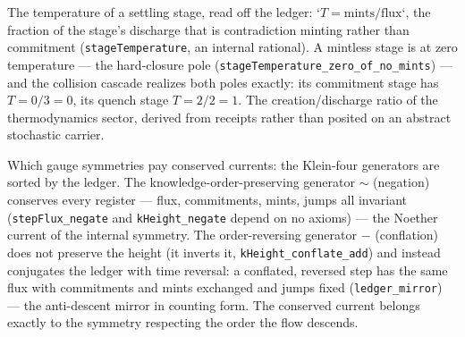 \begin{theorem}\label{thm:stage-temperature}\leanok{}
The temperature of a settling stage, read off the ledger: `\(T = \mathrm{mints}/\mathrm{flux}\)`,
the fraction of the stage's discharge that is contradiction minting rather than
commitment (\texttt{stageTemperature}, an internal rational). A mintless stage is at
zero temperature — the hard-closure pole
(\texttt{stageTemperature\_zero\_of\_no\_mints}) — and the collision cascade
realizes both poles exactly: its commitment stage has \(T = 0/3 = 0\), its quench
stage \(T = 2/2 = 1\). The creation/discharge ratio of the thermodynamics sector,
derived from receipts rather than posited on an abstract stochastic carrier.
\end{theorem}

\begin{theorem}\label{thm:ledger-noether}\leanok{}
Which gauge symmetries pay conserved currents: the Klein-four generators are sorted by
the ledger. The knowledge-order-preserving generator \(\sim\) (negation) conserves
every register --- flux, commitments, mints, jumps all invariant
(\texttt{stepFlux\_negate} and \texttt{kHeight\_negate} depend on no axioms) ---
the Noether current of the internal symmetry. The order-reversing generator \(-\)
(conflation) does not preserve the height (it inverts it,
\texttt{kHeight\_conflate\_add}) and instead conjugates the ledger with time
reversal: a conflated, reversed step has the same flux with commitments and mints
exchanged and jumps fixed (\texttt{ledger\_mirror}) --- the anti-descent mirror in
counting form. The conserved current belongs exactly to the symmetry respecting the
order the flow descends.
\end{theorem}

